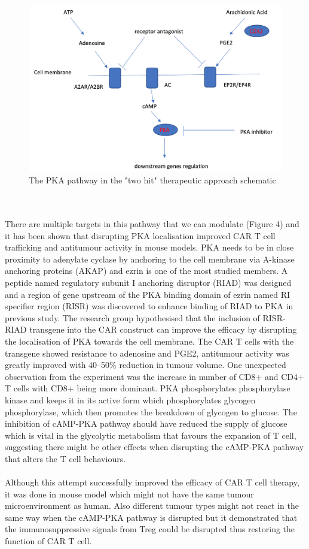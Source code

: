 \documentclass[12pt,oneside]{report}
\begin{document}
\begin{figure}[h!]
  \includegraphics[scale=0.35]{PKA-2.png}
  \caption{The PKA pathway in the "two hit" therapeutic approach schematic}
\end{figure}
\\\\There are multiple targets in this pathway that we can modulate (Figure 4) and it has been shown that disrupting PKA localisation improved CAR T cell trafficking and antitumour activity in mouse models\citep{cAMP-6}. PKA needs to be in close proximity to adenylate cyclase by anchoring to the cell membrane via A-kinase anchoring proteins (AKAP) and ezrin is one of the most studied members\citep{ezrin}. A peptide named regulatory subunit I anchoring disruptor (RIAD) was designed and a region of gene upstream of the PKA binding domain of ezrin named RI specifier region (RISR) was discovered to enhance binding of RIAD to PKA in previous study\citep{ezrin-2}. The research group hypothesised that the inclusion of RISR-RIAD transgene into the CAR construct can improve the efficacy by disrupting the localisation of PKA towards the cell membrane. The CAR T cells with the transgene showed resistance to adenosine and PGE2, antitumour activity was greatly improved with 40--50\% reduction in tumour volume\citep{cAMP-6}. One unexpected observation from the experiment was the increase in number of CD8+ and CD4+ T cells with CD8+ being more dominant. PKA phosphorylates phosphorylase kinase and keeps it in its active form which phosphorylates glycogen phosphorylase, which then promotes the breakdown of glycogen to glucose\citep{PKA}. The inhibition of cAMP-PKA pathway should have reduced the supply of glucose which is vital in the glycolytic metabolism that favours the expansion of T cell, suggesting there might be other effects when disrupting the cAMP-PKA pathway that alters the T cell behaviours. 
\\\\Although this attempt successfully improved the efficacy of CAR T cell therapy, it was done in mouse model which might not have the same tumour microenvironment as human. Also different tumour types might not react in the same way when the cAMP-PKA pathway is disrupted but it demonstrated that the immunosuppressive signals from Treg could be disrupted thus restoring the function of CAR T cell. 
\end{document}
